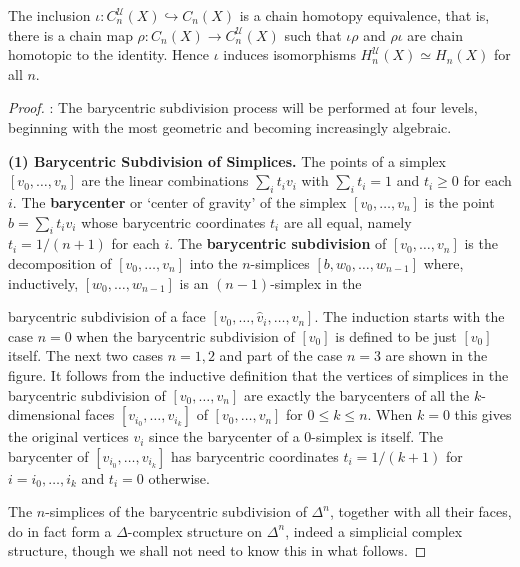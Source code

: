 \begin{proposition}
\label{prop:inclusion-u-chains-homotopy-equivalence}
The inclusion $\iota:C_n^{\mathcal{U}}(X) \hookrightarrow C_n(X)$ is a chain homotopy equivalence, that is, there is a chain map $\rho:C_n(X)\to C_n^{\mathcal{U}}(X)$ such that $\iota\rho$ and $\rho\iota$ are chain homotopic to the identity. Hence $\iota$ induces isomorphisms $H_n^{\mathcal{U}}(X) \simeq H_n(X)$ for all $n$.
\end{proposition}
\begin{proof}
: The barycentric subdivision process will be performed at four levels, beginning with the most geometric and becoming increasingly algebraic.

\textbf{(1) Barycentric Subdivision of Simplices.} The points of a simplex $[v_0,\ldots,v_n]$ are the linear combinations $\sum_i t_i v_i$ with $\sum_i t_i = 1$ and $t_i \ge 0$ for each $i$. The \textbf{barycenter} or `center of gravity' of the simplex $[v_0,\ldots,v_n]$ is the point $b = \sum_i t_i v_i$ whose barycentric coordinates $t_i$ are all equal, namely $t_i = 1/(n+1)$ for each $i$. The \textbf{barycentric subdivision} of $[v_0,\ldots,v_n]$ is the decomposition of $[v_0,\ldots,v_n]$ into the $n$-simplices $[b,w_0,\ldots,w_{n-1}]$ where, inductively, $[w_0,\ldots,w_{n-1}]$ is an $(n-1)$-simplex in the

barycentric subdivision of a face $[v_0,\ldots,\hat{v}_i,\ldots,v_n]$. The induction starts with the case $n=0$ when the barycentric subdivision of $[v_0]$ is defined to be just $[v_0]$ itself. The next two cases $n=1,2$ and part of the case $n=3$ are shown in the figure. It follows from the inductive definition that the vertices of simplices in the barycentric subdivision of $[v_0,\ldots,v_n]$ are exactly the barycenters of all the $k$-dimensional faces $[v_{i_0},\ldots,v_{i_k}]$ of $[v_0,\ldots,v_n]$ for $0 \le k \le n$. When $k=0$ this gives the original vertices $v_i$ since the barycenter of a $0$-simplex is itself. The barycenter of $[v_{i_0},\ldots,v_{i_k}]$ has barycentric coordinates $t_i = 1/(k+1)$ for $i = i_0,\ldots,i_k$ and $t_i = 0$ otherwise.



The $n$-simplices of the barycentric subdivision of $\Delta^n$, together with all their faces, do in fact form a $\Delta$-complex structure on $\Delta^n$, indeed a simplicial complex structure, though we shall not need to know this in what follows.


\end{proof}
